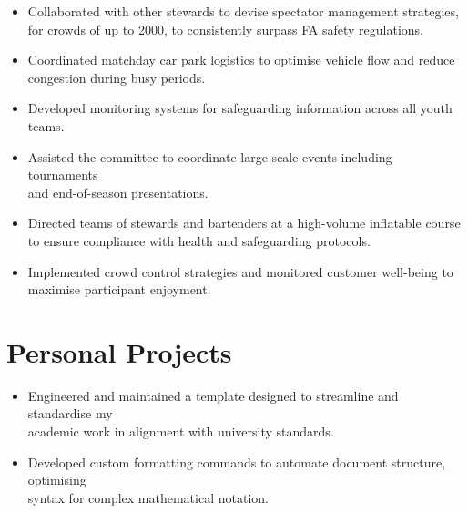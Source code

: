 \begin{itemize}
    \item Collaborated with other stewards to devise spectator management strategies, \\ for crowds of up to 2000, to consistently surpass FA safety regulations.
    \item Coordinated matchday car park logistics to optimise vehicle flow and reduce \\ congestion during busy periods.
\end{itemize}

\begin{itemize}
    \item Developed monitoring systems for safeguarding information across all youth teams. 
    \item Assisted the committee to coordinate large-scale events including tournaments \\ and end-of-season presentations. 
\end{itemize}

\begin{itemize}
    \item Directed teams of stewards and bartenders at a high-volume inflatable course \\ to ensure compliance with health and safeguarding protocols.
    \item Implemented crowd control strategies and monitored customer well-being to \\ maximise participant enjoyment.
\end{itemize}

\section*{Personal Projects}

\begin{itemize}
    \item Engineered and maintained a template designed to streamline and standardise my \\ academic work in alignment with university standards.
    \item Developed custom formatting commands to automate document structure, optimising \\ syntax for complex mathematical notation.
\end{itemize}

